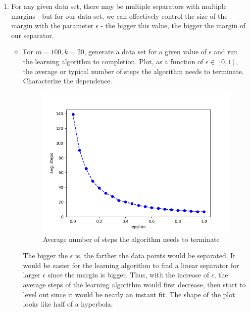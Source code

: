 \documentclass[letter, 12pt]{article}
\begin{document}
\begin{enumerate}
        \item {For any given data set, there may be multiple separators with multiple margins - but for our data set, we can effectively control the size of the margin with the parameter $ \epsilon $ - the bigger this value, the bigger the margin of our separator.}
        \begin{itemize}
            \item {For $ m = 100, k = 20 $, generate a data set for a given value of $ \epsilon $ and run the learning algorithm to
                completion. Plot, as a function of $ \epsilon \in [0, 1] $, the average or typical number of steps the algorithm needs to
                terminate. Characterize the dependence.}
            \begin{figure}[H]
            	\centering
            	\includegraphics[width=.7\textwidth]{q3.png}
            	\caption{Average number of steps the algorithm needs to terminate}
            \end{figure}
        	\par{The bigger the $ \epsilon $ is, the farther the data points would be separated. It would be easier for the learning algorithm to find a linear separator for larger $ \epsilon $ since the margin is bigger. Thus, with the increase of $ \epsilon $, the average steps of the learning algorithm would first decrease, then start to level out since it would be nearly an instant fit. The shape of the plot looks like half of a hyperbola. }
        \end{itemize}
    

\end{enumerate}
\end{document}
